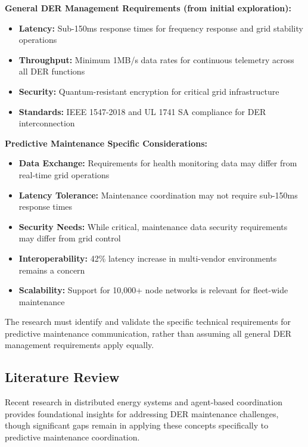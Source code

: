 \documentclass[12pt,a4paper]{article}
\begin{document}
\textbf{General DER Management Requirements (from initial exploration):}
\begin{itemize}
\item \textbf{Latency:} Sub-150ms response times for frequency response and grid stability operations
\item \textbf{Throughput:} Minimum 1MB/s data rates for continuous telemetry across all DER functions
\item \textbf{Security:} Quantum-resistant encryption for critical grid infrastructure
\item \textbf{Standards:} IEEE 1547-2018 and UL 1741 SA compliance for DER interconnection
\end{itemize}

\textbf{Predictive Maintenance Specific Considerations:}
\begin{itemize}
\item \textbf{Data Exchange:} Requirements for health monitoring data may differ from real-time grid operations
\item \textbf{Latency Tolerance:} Maintenance coordination may not require sub-150ms response times
\item \textbf{Security Needs:} While critical, maintenance data security requirements may differ from grid control
\item \textbf{Interoperability:} 42\% latency increase in multi-vendor environments remains a concern
\item \textbf{Scalability:} Support for 10,000+ node networks is relevant for fleet-wide maintenance
\end{itemize}

The research must identify and validate the specific technical requirements for predictive maintenance communication, rather than assuming all general DER management requirements apply equally.

\subsection{Literature Review}

Recent research in distributed energy systems and agent-based coordination provides foundational insights for addressing DER maintenance challenges, though significant gaps remain in applying these concepts specifically to predictive maintenance coordination.
\end{document}
